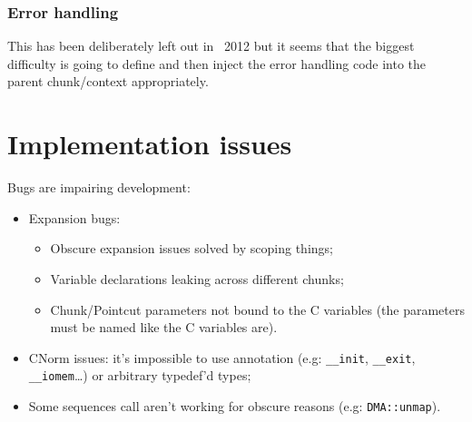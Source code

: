 \documentclass[american]{rtxarticle}
\begin{document}
\subsubsection{Error handling}

This has been deliberately left out in \rtx\ 2012 but it seems that the
biggest difficulty is going to define and then inject the error handling code
into the parent chunk/context appropriately.

\section{Implementation issues}

Bugs are impairing development:

\begin{itemize}
\item Expansion bugs:
\begin{itemize}
\item Obscure expansion issues solved by scoping things;
\item Variable declarations leaking across different chunks;
\item Chunk/Pointcut parameters not bound to the C variables (the parameters
      must be named like the C variables are).
\end{itemize}
\item CNorm issues: it's impossible to use annotation (e.g: \texttt{\_\_init},
      \texttt{\_\_exit}, \texttt{\_\_iomem}\ldots) or arbitrary typedef'd
      types;
\item Some sequences call aren't working for obscure reasons (e.g:
      \texttt{DMA::unmap}).
\end{itemize}
\end{document}
